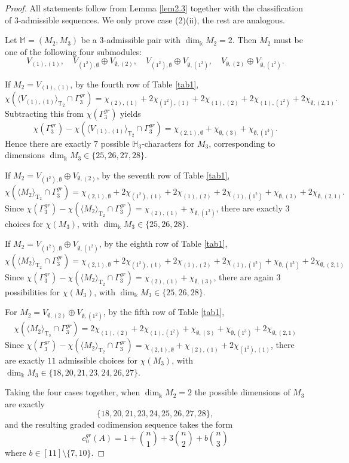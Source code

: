 \documentclass{amsart}
\theoremstyle{definition}
\theoremstyle{remark}
\numberwithin{equation}{section}
\newcommand{\lr}[1]{\langle #1 \rangle}
\def \Ga{\Gamma}
\def \k{\Bbbk}
\def \H{\mathbb{H}}
\def \M{\mathbb{M}}
\def \T{\operatorname{T}}
\def \es{\emptyset}
\begin{document}
\begin{proof}
	All statements follow from Lemma \ref{lem2.3} together with the classification of $3$-admissible sequences. We only prove case (2)(ii), the rest are analogous.
	
	Let $\M=(M_2,M_3)$ be a $3$-admissible pair with $\dim_{\k} M_2 = 2$. Then $M_2$ must be one of the following four submodules:
	\[
	V_{(1),(1)},\quad V_{(1^2),\es} \oplus V_{\es,(2)},\quad V_{(1^2),\es} \oplus V_{\es,(1^2)},\quad V_{\es,(2)} \oplus V_{\es,(1^2)}.
	\]
	
	If $M_2 = V_{(1),(1)}$, by the fourth row of Table \ref{tab1},
	\[
	\chi({\lr{V_{(1),(1)}}_{\T_2} \cap \Ga_3^{gr}}) = \chi_{(2),(1)} + 2\chi_{(1^2),(1)} + 2\chi_{(1),(2)} + 2\chi_{(1),(1^2)} + 2\chi_{\es, (2,1)}.
	\]
	Subtracting this from $\chi(\Ga_3^{gr})$ yields
	\[
	\chi(\Ga_3^{gr})-\chi(\lr{V_{(1),(1)}}_{\T_2} \cap \Ga_3^{gr})=\chi_{(2,1),\es}+\chi_{\es, (3)}+\chi_{\es, (1^3)}.
	\]
	Hence there are exactly $7$ possible $\H_3$-characters for $M_3$, corresponding to dimensions $\dim_{\k} M_3 \in \{25, 26, 27, 28\}$.
	
	
	If $M_2=V_{(1^2),\es} \oplus V_{\es,(2)}$, by the seventh  row of Table \ref{tab1}, 
	\[
	\chi({\lr{M_2}_{\T_2} \cap \Ga_3^{gr}}) =\chi_{(2,1),\es} + 2\chi_{(1^2),(1)} + 2\chi_{(1),(2)} + 2\chi_{(1),(1^2)} + \chi_{\es,(3)} + 2\chi_{\es, (2,1)}.
	\]
	Since $\chi(\Ga_3^{gr})-\chi(\lr{M_2}_{\T_2} \cap \Ga_3^{gr})=\chi_{(2),(1)}+\chi_{\es, (1^3)}$, there are exactly $3$ choices for $\chi(M_3)$, with $\dim_{\k} M_3 \in \{25, 26, 28\}$.
	
	If $M_2=V_{(1^2),\es} \oplus V_{\es,(1^2)}$, by the eighth row of Table \ref{tab1},
	\[
	\chi({\lr{M_2}_{\T_2} \cap \Ga_3^{gr}}) =\chi_{(2,1),\es} +  2\chi_{(1^2),(1)} + 2\chi_{(1),(2)} + 2\chi_{(1),(1^2)} + \chi_{\es,(1^3)} + 2\chi_{\es, (2,1)}
	\]
	Since $\chi(\Ga_3^{gr})-\chi(\lr{M_2}_{\T_2} \cap \Ga_3^{gr})=\chi_{(2),(1)}+\chi_{\es, (3)}$, there are again $3$ possibilities for $\chi(M_3)$, with $\dim_{\k}M_3 \in \{25,26,28\}$.
	
	For $M_2=V_{\es,(2)} \oplus V_{\es,(1^2)}$, by the fifth row of Table \ref{tab1}, 
	\[
	\chi({\lr{M_2}_{\T_2} \cap \Ga_3^{gr}}) = 2\chi_{(1),(2)} + 2\chi_{(1),(1^2)} + \chi_{\es,(3)} + \chi_{\es,(1^3)} + 2\chi_{\es, (2,1)}
	\]
	Since $\chi(\Ga_3^{gr})-\chi(\lr{M_2}_{\T_2} \cap \Ga_3^{gr})=\chi_{(2,1),\es}+\chi_{(2),(1)}+2\chi_{(1^2), (1)}$, there are exactly $11$ admissible choices for $\chi(M_3)$, with $\dim_{\k}M_3 \in \{18,20,21,23,24,26,27\}$.
	
	Taking the four cases together, when $\dim_{\k} M_2 = 2$ the possible dimensions of $M_3$ are exactly 
	\[
	\{18, 20, 21, 23, 24, 25, 26, 27, 28\},
	\]
	and the resulting graded codimension sequence takes the form
	\[
	c_n^{gr}(A)= 1+\binom{n}{1}+3\binom{n}{2}+b\binom{n}{3}
	\]
	where $b \in [11] \setminus \{7,10\}$.
\end{proof}
\end{document}

